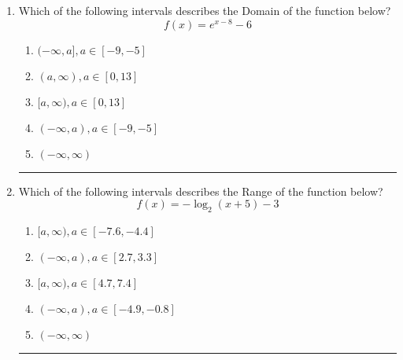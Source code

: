 \documentclass[14pt]{extbook}
\newcommand{\litem}[1]{\item#1\hspace*{-1cm}\rule{\textwidth}{0.4pt}}
\begin{document}
\begin{enumerate}
{\begin{enumerate}[label=\Alph*.]
\end{enumerate} }
\litem{
Which of the following intervals describes the Domain of the function below?\[ f(x) = e^{x-8}-6 \]\begin{enumerate}[label=\Alph*.]
\item \( (-\infty, a], a \in [-9, -5] \)
\item \( (a, \infty), a \in [0, 13] \)
\item \( [a, \infty), a \in [0, 13] \)
\item \( (-\infty, a), a \in [-9, -5] \)
\item \( (-\infty, \infty) \)

\end{enumerate} }
\litem{
Which of the following intervals describes the Range of the function below?\[ f(x) = -\log_2{(x+5)}-3 \]\begin{enumerate}[label=\Alph*.]
\item \( [a, \infty), a \in [-7.6, -4.4] \)
\item \( (-\infty, a), a \in [2.7, 3.3] \)
\item \( [a, \infty), a \in [4.7, 7.4] \)
\item \( (-\infty, a), a \in [-4.9, -0.8] \)
\item \( (-\infty, \infty) \)

\end{enumerate} }
\end{enumerate}
\end{document}
